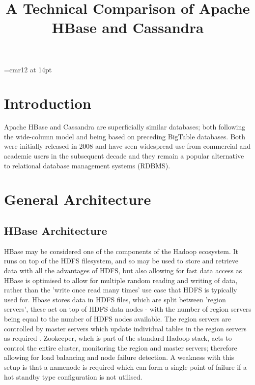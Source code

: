 \documentclass[10pt]{article}
\begin{document}
%
\font\myfont=cmr12 at 14pt
\title{{\myfont A Technical Comparison of Apache HBase and Cassandra }}
\author{\vspace{-10ex}}
\date{\vspace{-10ex}}
\maketitle
\vspace{-1cm}
%





\section{Introduction}
Apache HBase and Cassandra are superficially similar databases; both following the wide-column model and being based on preceding BigTable databases. Both were initially released in 2008 and have seen widespread use from commercial and academic users in the subsequent decade and they remain a popular alternative to relational database management systems (RDBMS).

\section{General Architecture}
\subsection {HBase Architecture}
HBase may be considered one of the components of the Hadoop ecosystem. It runs on top of the HDFS filesystem, and so may be used to store and retrieve data with all the advantages of HDFS, but also allowing for fast data access as HBase is optimised to allow for multiple random reading and writing of data, rather than the 'write once read many times' use case that HDFS is typically used for.  Hbase stores data in HDFS files, which are split between 'region servers', these act on top of HDFS data nodes - with the number of region servers being equal to the number of HDFS nodes available. The region servers are controlled by master servers which update individual tables in the region servers as required \cite{6885425}. Zookeeper, whch is part of the standard Hadoop stack, acts to control the entire cluster, monitoring the region and master servers; therefore allowing for load balancing and node failure detection. A weakness with this setup is that a namenode is required which can form a single point of failure if a hot standby type configuration is not utilised.\\
\end{document}
